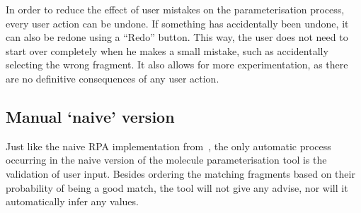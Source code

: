 In order to reduce the effect of user mistakes on the parameterisation process, every user action can be undone. If something has accidentally been undone, it can also be redone using a ``Redo'' button. This way, the user does not need to start over completely when he makes a small mistake, such as accidentally selecting the wrong fragment. It also allows for more experimentation, as there are no definitive consequences of any user action.


\subsection{Manual `naive' version}
Just like the naive RPA implementation from~\cite{payne2000varying}, the only automatic process occurring in the naive version of the molecule parameterisation tool is the validation of user input. Besides ordering the matching fragments based on their probability of being a good match, the tool will not give any advise, nor will it automatically infer any values.

